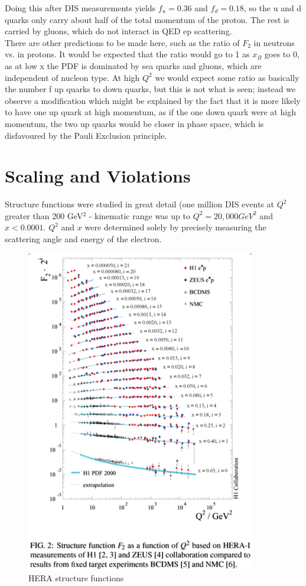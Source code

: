         Doing this after DIS measurements yields $f_u = 0.36$ and $f_d = 0.18$, so the u and d quarks only carry about half of the total momentum of the proton. The rest is carried by gluons, which do not interact in QED ep scattering. \\
        
        There are other predictions to be made here, such as the ratio of $F_2$ in neutrons vs. in protons. It would be expected that the ratio would go to 1 as $x_B$ goes to 0, as at low x the PDF is dominated by sea quarks and gluons, which are independent of nucleon type. At high $Q^2$ we would expect some ratio as basically the number f up quarks to down quarks, but this is not what is seen; instead we observe a modification which might be explained by the fact that it is more likely to have one up quark at high momentum, as if the one down quark were at high momentum, the two up quarks would be closer in phase space, which is disfavoured by the Pauli Exclusion principle. 
    \section{Scaling and Violations}
        Structure functions were studied in great detail (one million DIS events at $Q^2$ greater than 200 GeV$^2$ - kinematic range was up to $Q^2 = 20,000 GeV^2$ and $x < 0.0001$. $Q^2$ and $x$ were determined solely by precisely measuring the scattering angle and energy of the electron. 
        
        \begin{figure}[H]
            \centering
            \includegraphics[width=10cm]{NuclearPhysics/modules/lepton-scattering/pics/inelastic-ep/Hera-dis.PNG}
            \caption{HERA structure functions}
        \end{figure}
        
